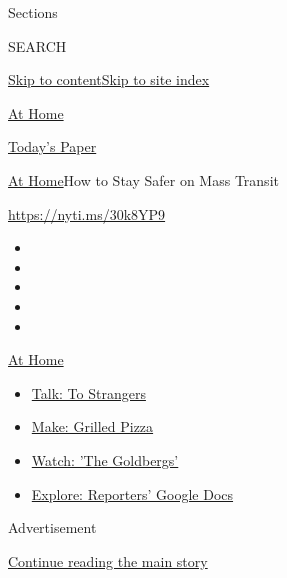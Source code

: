 Sections

SEARCH

\protect\hyperlink{site-content}{Skip to
content}\protect\hyperlink{site-index}{Skip to site index}

\href{https://www.nytimes.com/spotlight/at-home}{At Home}

\href{https://myaccount.nytimes.com/auth/login?response_type=cookie\&client_id=vi}{}

\href{https://www.nytimes.com/section/todayspaper}{Today's Paper}

\href{/spotlight/at-home}{At Home}\textbar{}How to Stay Safer on Mass
Transit

\url{https://nyti.ms/30k8YP9}

\begin{itemize}
\item
\item
\item
\item
\item
\end{itemize}

\href{https://www.nytimes.com/spotlight/at-home?action=click\&pgtype=Article\&state=default\&region=TOP_BANNER\&context=at_home_menu}{At
Home}

\begin{itemize}
\tightlist
\item
  \href{https://www.nytimes.com/2020/08/03/well/family/the-benefits-of-talking-to-strangers.html?action=click\&pgtype=Article\&state=default\&region=TOP_BANNER\&context=at_home_menu}{Talk:
  To Strangers}
\item
  \href{https://www.nytimes.com/2020/08/01/at-home/coronavirus-make-pizza-on-a-grill.html?action=click\&pgtype=Article\&state=default\&region=TOP_BANNER\&context=at_home_menu}{Make:
  Grilled Pizza}
\item
  \href{https://www.nytimes.com/2020/07/31/arts/television/goldbergs-abc-stream.html?action=click\&pgtype=Article\&state=default\&region=TOP_BANNER\&context=at_home_menu}{Watch:
  'The Goldbergs'}
\item
  \href{https://www.nytimes.com/interactive/2020/at-home/even-more-reporters-editors-diaries-lists-recommendations.html?action=click\&pgtype=Article\&state=default\&region=TOP_BANNER\&context=at_home_menu}{Explore:
  Reporters' Google Docs}
\end{itemize}

Advertisement

\protect\hyperlink{after-top}{Continue reading the main story}

